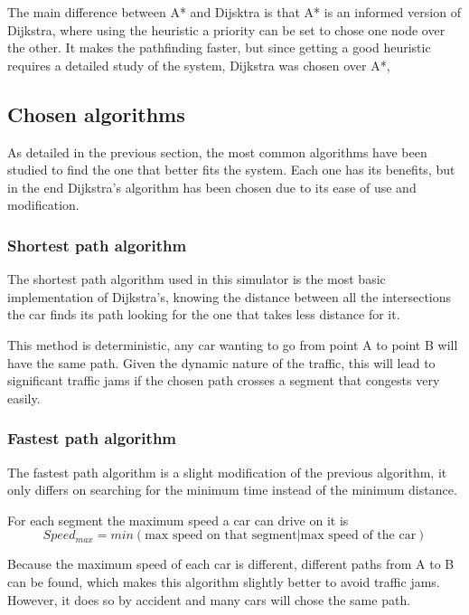 
The main difference between A* and Dijsktra is that A* is an informed version of Dijkstra, where using the heuristic a priority can be set to chose one node over the other. It makes the pathfinding faster, but since getting a good heuristic requires a detailed study of the system, Dijkstra was chosen over A*,

\subsection{Chosen algorithms}

As detailed in the previous section, the most common algorithms have been studied to find the one that better fits the system. Each one has its benefits, but in the end Dijkstra's algorithm has been chosen due to its ease of use and modification.

\subsubsection{Shortest path algorithm}

The shortest path algorithm used in this simulator is the most basic implementation of Dijkstra's, knowing the distance between all the intersections the car finds its path looking for the one that takes less distance for it.

This method is deterministic, any car wanting to go from point A to point B will have the same path. Given the dynamic nature of the traffic, this will lead to significant traffic jams if the chosen path crosses a segment that congests very easily.

\subsubsection{Fastest path algorithm}

The fastest path algorithm is a slight modification of the previous algorithm, it only differs on searching for the minimum time instead of the minimum distance.

For each segment the maximum speed a car can drive on it is \[Speed_{max} = min(\text{max speed on that segment} | \text{max speed of the car})\]

Because the maximum speed of each car is different, different paths from A to B can be found, which makes this algorithm slightly better to avoid traffic jams. However, it does so by accident and many cars will chose the same path.

